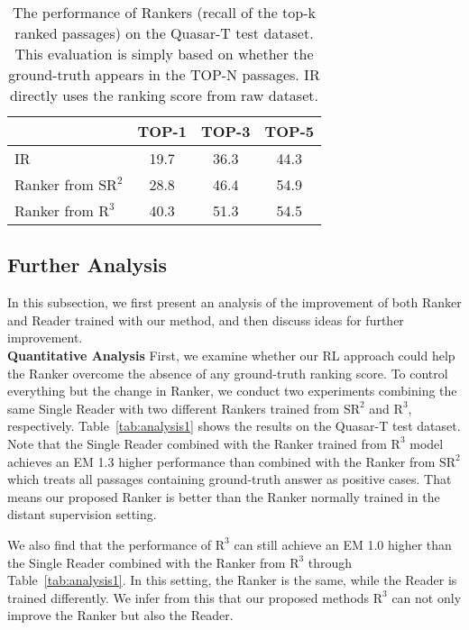 \documentclass[letterpaper]{article} \usepackage{aaai18}  \usepackage{times}  \usepackage{helvet}  \usepackage{courier}  \usepackage{url}  \usepackage{graphicx}  \usepackage{comment}
\begin{document}
\begin{table}[t]
\centering
\begin{tabular}{lccc}
\toprule
              & TOP-1 & TOP-3 & TOP-5 \\
\midrule
IR            & 19.7 & 36.3 & 44.3 \\
Ranker from $\text{SR}^2$ & 28.8 & 46.4 & 54.9 \\
Ranker from $\text{R}^3$  & 40.3 & 51.3 & 54.5 \\
 \bottomrule
\end{tabular}
\caption{The performance of Rankers (recall of the top-k ranked passages) on the Quasar-T test dataset. This evaluation is simply based on whether the ground-truth appears in the TOP-N passages. IR directly uses the ranking score from raw dataset.}
\label{tab:ranker_analysis}
\end{table}


\subsection{Further Analysis}
In this subsection, we first present an analysis of the improvement of both Ranker and Reader trained with our method, and then discuss ideas for further improvement.\\

\noindent\textbf{Quantitative Analysis}\quad
First, we examine whether our RL approach could help the Ranker overcome the absence of any ground-truth ranking score. To control everything but the change in Ranker, we conduct two experiments combining the same Single Reader with two different Rankers trained from $\text{SR}^2$ and $\text{R}^3$, respectively. Table~\ref{tab:analysis1} shows the results on the Quasar-T test dataset. Note that the Single Reader combined with the Ranker trained from $\text{R}^3$ model achieves an EM 1.3 higher performance than combined with the Ranker from $\text{SR}^2$ which treats all passages containing ground-truth answer as positive cases. That means our proposed Ranker is better than the Ranker normally trained in the distant supervision setting.

We also find that the performance of $\text{R}^3$ can still achieve an EM 1.0 higher than the Single Reader combined with the Ranker from $\text{R}^3$ through Table~\ref{tab:analysis1}. In this setting, the Ranker is the same, while the Reader is trained differently. We infer from this that our proposed methods $\text{R}^3$ can not only improve the Ranker but also the Reader. \\
\end{document}
